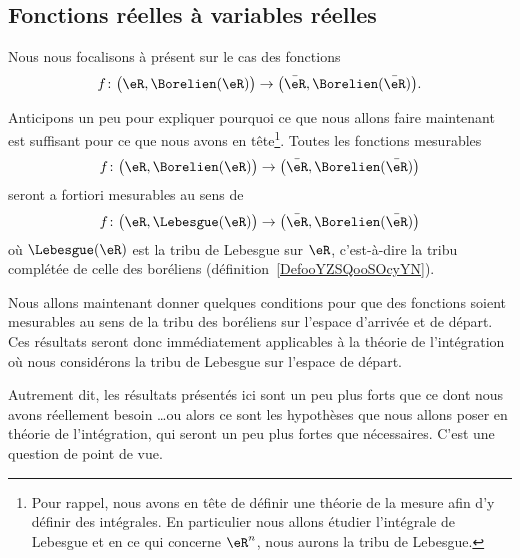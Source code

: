 \subsection{Fonctions réelles à variables réelles}

Nous nous focalisons à présent sur le cas des fonctions
\begin{equation}
	f\colon \big( \eR,\Borelien(\eR) \big)\to \big( \bar\eR,\Borelien(\bar \eR) \big).
\end{equation}

\begin{normaltext}      \label{NORMooNFOMooYnaflN}
	Anticipons un peu pour expliquer pourquoi ce que nous allons faire maintenant est suffisant pour ce que nous avons en tête\footnote{Pour rappel, nous avons en tête de définir une théorie de la mesure afin d'y définir des intégrales. En particulier nous allons étudier l'intégrale de Lebesgue et en ce qui concerne \( \eR^n\), nous aurons la tribu de Lebesgue.}. Toutes les fonctions mesurables
	\begin{equation}
		f\colon \big( \eR,\Borelien(\eR) \big)\to \big( \bar\eR,\Borelien(\bar \eR) \big)
	\end{equation}
	seront a fortiori mesurables au sens de
	\begin{equation}
		f\colon \big( \eR,\Lebesgue(\eR) \big)\to \big( \bar\eR,\Borelien(\bar \eR) \big)
	\end{equation}
	où \( \Lebesgue(\eR)\) est la tribu de Lebesgue sur \( \eR\), c'est-à-dire la tribu complétée de celle des boréliens (définition~\ref{DefooYZSQooSOcyYN}).
\end{normaltext}

\begin{normaltext}
	Nous allons maintenant donner quelques conditions pour que des fonctions soient mesurables au sens de la tribu des boréliens sur l'espace d'arrivée et de départ. Ces résultats seront donc immédiatement applicables à la théorie de l'intégration où nous considérons la tribu de Lebesgue sur l'espace de départ.

	Autrement dit, les résultats présentés ici sont un peu plus forts que ce dont nous avons réellement besoin \ldots ou alors ce sont les hypothèses que nous allons poser en théorie de l'intégration, qui seront un peu plus fortes que nécessaires. C'est une question de point de vue.
\end{normaltext}

